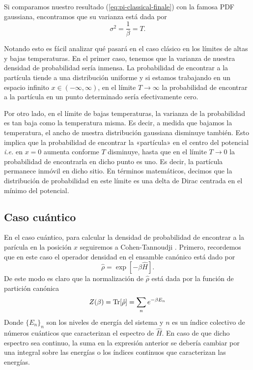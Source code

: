 \documentclass[%
 reprint,
 amsmath,amssymb,
 aps,
 pra,
]{revtex4-2}
\begin{document}
Si comparamos nuestro resultado (\ref{eq:pi-classical-finale}) con la famosa PDF gaussiana, encontramos que su varianza está dada por
\begin{equation}
	\sigma^2 = \frac{1}{\beta} = T.
\end{equation}

Notando esto es fácil analizar qué pasará en el caso clásico en los límites de altas y bajas temperaturas. En el primer caso, tenemos que la varianza de nuestra densidad de probabilidad sería inmensa. La probabilidad de encontrar a la partícula tiende a una distribución uniforme y si estamos trabajando en un espacio infinito $x\in(-\infty,\infty)$, en el límite $T\rightarrow\infty$ la probabilidad de encontrar a la partícula en un punto determinado sería efectivamente cero.

Por otro lado, en el límite de bajas temperaturas, la varianza de la probabilidad es tan baja como la temperatura misma. Es decir, a medida que bajamos la temperatura, el ancho de nuestra distribución gaussiana disminuye también. Esto implica que la probabilidad de encontrar la «partícula» en el centro del potencial \textit{i.e.} en $x=0$ aumenta conforme $T$ disminuye, hasta que en el límite $T\rightarrow 0$ la probabilidad de encontrarla en dicho punto es uno. Es decir, la partícula permanece inmóvil en dicho sitio. En términos matemáticos, decimos que la distribución de probabilidad en este límite es una delta de Dirac centrada en el mínimo del potencial.

\subsection{Caso cuántico} \label{subsec:caso-cuantico}
En el caso cuántico, para calcular la densidad de probabilidad de encontrar a la parícula en la posición $x$ seguiremos a Cohen-Tannoudji \cite{Cohen-Tannoudji}. Primero, recordemos que en este caso el operador densidad en el ensamble canónico está dado por
\begin{equation}
	\hat{\rho} = \exp[-\beta \hat{H}].
\end{equation}
De este modo es claro que la normalización de $\hat{\rho}$ está dada por la función de partición canónica
\begin{equation}
	Z(\beta) = \Tr[\hat{\rho}]=\sum_n e^{-\beta E_n}\label{eq:Quantum-Z}
\end{equation} 
Donde $\{E_n\}_n$ son los niveles de energía del sistema y $n$ es un índice colectivo de números cuánticos que caracterizan el espectro de $\hat{H}$. En caso de que dicho espectro sea continuo, la suma en la expresión anterior se debería cambiar por una integral sobre las energías o los índices continuos que caracterizan las energías. 
\end{document}
